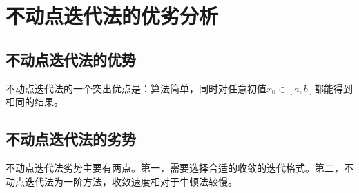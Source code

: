 \section{不动点迭代法的优劣分析}
\subsection{不动点迭代法的优势}
不动点迭代法的一个突出优点是：算法简单，同时对任意初值$x_0 \in [a,b]$都能得到相同的结果。
\subsection{不动点迭代法的劣势}
不动点迭代法劣势主要有两点。第一，需要选择合适的收敛的迭代格式。第二，不动点迭代法为一阶方法，收敛速度相对于牛顿法较慢。
  
